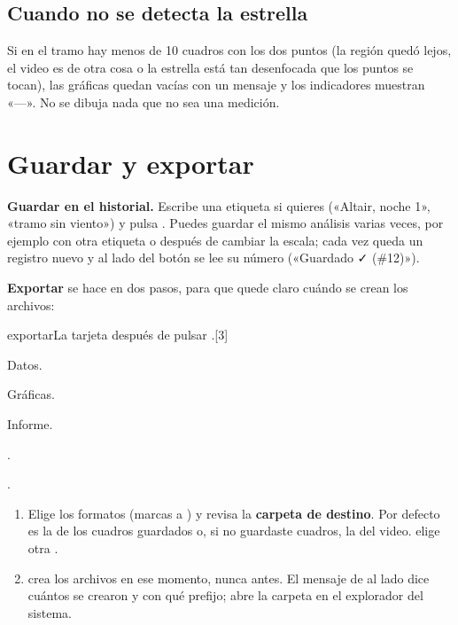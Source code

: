 \subsection{Cuando no se detecta la estrella}

Si en el tramo hay menos de 10 cuadros con los dos puntos (la región quedó lejos, el video es de otra cosa o la estrella
está tan desenfocada que los puntos se tocan), las gráficas quedan vacías con un mensaje y los indicadores muestran
«—». No se dibuja nada que no sea una medición.


\section{Guardar y exportar}\label{sec:exportar}

\textbf{Guardar en el historial.} Escribe una etiqueta si quieres («Altair, noche 1», «tramo sin viento») y pulsa
. Puedes guardar el mismo análisis varias veces, por ejemplo con otra etiqueta o después de
cambiar la escala; cada vez queda un registro nuevo y al lado del botón se lee su número («Guardado ✓ (\#12)»).

\textbf{Exportar} se hace en dos pasos, para que quede claro cuándo se crean los archivos:

\begin{capturam}{exportar}{La tarjeta  después de pulsar .}[3]
\item Datos.
\item Gráficas.
\item Informe.
\item {}
\item {}.
\item {}.
\end{capturam}

\begin{enumerate}
\item Elige los formatos (marcas  a ) y revisa la \textbf{carpeta de destino}. Por defecto es la de
los cuadros guardados o, si no guardaste cuadros, la del video.  elige otra .
\item {}  crea los archivos en ese momento, nunca antes. El mensaje de al lado dice cuántos se
crearon y con qué prefijo;   abre la carpeta en el explorador del sistema.
\end{enumerate}

